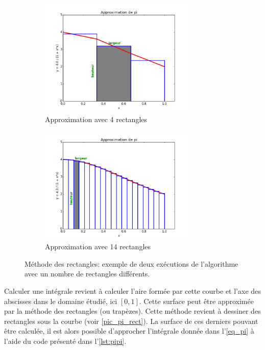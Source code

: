         \begin{figure}[t!]
            \centering
            \begin{subfigure}[t]{0.5\textwidth}
                \centering
                \includegraphics[height=2.2in]{images/Chapitre1/pic_pi_rect_1.png}
                \caption{\label{pic_pi_1} Approximation avec 4 rectangles}
            \end{subfigure}%
        \begin{subfigure}[t]{0.5\textwidth}
                \centering
                \includegraphics[height=2.2in]{images/Chapitre1/pic_pi_rect_2.png}
                \caption{\label{pic_pi_2} Approximation avec 14 rectangles}
            \end{subfigure}
            \caption{\label{pic_pi_rect} Méthode des rectangles: exemple de deux exécutions de l'algorithme avec un nombre de rectangles différents.}
            
        \end{figure}
            
        Calculer une intégrale revient à calculer l'aire formée par cette courbe et l'axe des abscisses dans le domaine étudié, ici $[0,1]$. Cette surface peut être approximée par la méthode des rectangles (ou trapèzes). Cette méthode revient à dessiner des rectangles sous la courbe (voir \autoref{pic_pi_rect}). La surface de ces derniers pouvant être calculée, il est alors possible d'approcher l'intégrale donnée dans l'\autoref{eq_pi} à l'aide du code présenté dans l'\autoref{lst:pipi}.
        
